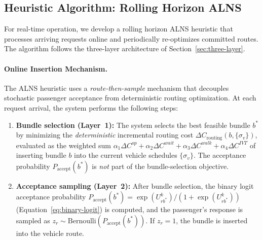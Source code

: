\subsection{Heuristic Algorithm: Rolling Horizon ALNS}\label{subsec:alns}

For real-time operation, we develop a rolling horizon ALNS heuristic that processes
arriving requests online and periodically re-optimizes committed routes. The algorithm
follows the three-layer architecture of Section~\ref{sec:three-layer}.

\paragraph{Online Insertion Mechanism.}
The ALNS heuristic uses a \emph{route-then-sample} mechanism that decouples
stochastic passenger acceptance from deterministic routing optimization.
At each request arrival, the system performs the following steps:
\begin{enumerate}
  \item \textbf{Bundle selection (Layer~1):} The system selects the best feasible bundle
        $b^*$ by minimizing the \emph{deterministic} incremental routing cost
        $\Delta C_{\text{routing}}(b, \{\sigma_v\})$, evaluated as the weighted sum
        $\alpha_1 \Delta C^{op} + \alpha_2 \Delta C^{wait} + \alpha_3 \Delta C^{walk}
        + \alpha_4 \Delta C^{IVT}$ of inserting bundle $b$ into the current vehicle
        schedules $\{\sigma_v\}$. The acceptance probability $P_{\text{accept}}(b^*)$
        is \emph{not} part of the bundle-selection objective.
  \item \textbf{Acceptance sampling (Layer~2):} After bundle selection, the binary logit
        acceptance probability $P_{\text{accept}}(b^*) = \exp(U_{rb^*}^k) /
        (1 + \exp(U_{rb^*}^k))$ (Equation~\ref{eq:binary-logit}) is computed, and
        the passenger's response is sampled as
        $z_r \sim \text{Bernoulli}(P_{\text{accept}}(b^*))$.
        If $z_r = 1$, the bundle is inserted into the vehicle route.
\end{enumerate}

